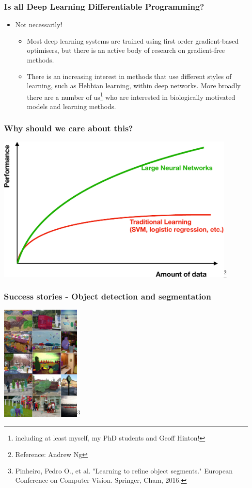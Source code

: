 \documentclass[\beamerclass]{beamer}
\begin{document}
\begin{frame}
\frametitle{Is all Deep Learning Differentiable Programming?}
\begin{itemize}
	\item Not necessarily!
	\begin{itemize}
		\item<+-> Most deep learning systems are trained using first order gradient-based optimisers, but there is an active body of research on gradient-free methods.
		\item<+-> There is an increasing interest in methods that use different styles of learning, such as Hebbian learning, within deep networks. More broadly there are a number of us\footnote{including at least myself, my PhD students and Geoff Hinton!} who are interested in biologically motivated models and learning methods.
	\end{itemize}
\end{itemize}
\end{frame}

\begin{frame}
	\frametitle{Why should we care about this?}
	\centering \includegraphics[width=0.9\textwidth]{Fig1.pdf}\footnote{Reference: Andrew Ng}
\end{frame}

\begin{frame}
	\frametitle{Success stories - Object detection and segmentation}
	\centering \includegraphics[width=0.3\textwidth]{objseg.pdf}\footnote{Pinheiro, Pedro O., et al. "Learning to refine object segments." European Conference on Computer Vision. Springer, Cham, 2016.}
\end{frame}
\end{document}

